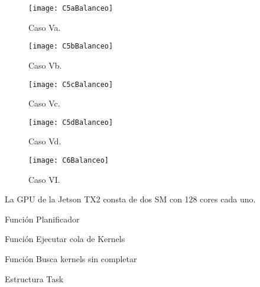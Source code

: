     \begin{figure}[ht]
      \centering
        \texttt{[image: C5aBalanceo]}
        \caption{Caso Va.}
        \label{fig:C5aBalanceo}
    \end{figure}
    
    \begin{figure}[ht]
      \centering
        \texttt{[image: C5bBalanceo]}
        \caption{Caso Vb.}
        \label{fig:C5bBalanceo}
    \end{figure}
    
    \begin{figure}[ht]
      \centering
        \texttt{[image: C5cBalanceo]}
        \caption{Caso Vc.}
        \label{fig:C5cBalanceo}
    \end{figure}
    
    \begin{figure}[ht]
      \centering
        \texttt{[image: C5dBalanceo]}
        \caption{Caso Vd.}
        \label{fig:C5dBalanceo}
    \end{figure}
    
    \begin{figure}[ht]
      \centering
        \texttt{[image: C6Balanceo]}
        \caption{Caso VI.}
        \label{fig:C6Balanceo}
    \end{figure}
    
    
    


La GPU de la Jetson TX2 consta de dos SM con 128 cores cada uno\cite{SMJetson}.

Función Planificador


  
Función Ejecutar cola de Kernels



Función Busca kernels sin completar



Estructura Task

